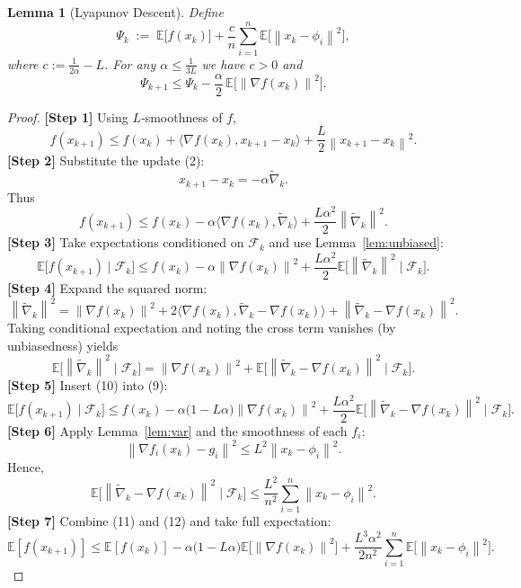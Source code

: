 \documentclass{article}
\newtheorem{lemma}{Lemma}
\newcommand{\E}{\mathbb{E}}
\newcommand{\grad}{\nabla}
\newcommand{\norm}[1]{\left\|#1\right\|}
\newcommand{\inner}[2]{\langle #1,#2\rangle}
\begin{document}
\begin{lemma}[Lyapunov Descent]\label{lem:lyapunov}
Define
\[
\Psi_k\;:=\; \E\!\bigl[f(x_k)\bigr]
+\frac{c}{n}\sum_{i=1}^{n}\E\!\bigl[\norm{x_k-\phi_i}^{2}\bigr],
\]
where $c:=\frac{1}{2\alpha}-L$. For any $\alpha\le\frac{1}{3L}$ we have $c>0$ and
\[
\Psi_{k+1}\le \Psi_k-\frac{\alpha}{2}\,\E\!\bigl[\norm{\grad f(x_k)}^{2}\bigr].
\tag{6}
\]
\end{lemma}
\begin{proof}
\textbf{[Step 1]} Using $L$‑smoothness of $f$,
\[
f(x_{k+1})\le f(x_k)+\inner{\grad f(x_k)}{x_{k+1}-x_k}
+\frac{L}{2}\norm{x_{k+1}-x_k}^{2}.
\tag{7}
\]
\textbf{[Step 2]} Substitute the update (2):
\[
x_{k+1}-x_k=-\alpha\widetilde{\nabla}_k .
\]
Thus
\[
f(x_{k+1})\le f(x_k)-\alpha\inner{\grad f(x_k)}{\widetilde{\nabla}_k}
+\frac{L\alpha^{2}}{2}\norm{\widetilde{\nabla}_k}^{2}.
\tag{8}
\]
\textbf{[Step 3]} Take expectations conditioned on $\mathcal{F}_k$ and use Lemma~\ref{lem:unbiased}:
\[
\E\!\bigl[f(x_{k+1})\mid\mathcal{F}_k\bigr]
\le f(x_k)-\alpha\norm{\grad f(x_k)}^{2}
+\frac{L\alpha^{2}}{2}\E\!\bigl[\norm{\widetilde{\nabla}_k}^{2}\mid\mathcal{F}_k\bigr].
\tag{9}
\]
\textbf{[Step 4]} Expand the squared norm:
\[
\norm{\widetilde{\nabla}_k}^{2}
=\norm{\grad f(x_k)}^{2}
+2\inner{\grad f(x_k)}{\widetilde{\nabla}_k-\grad f(x_k)}
+\norm{\widetilde{\nabla}_k-\grad f(x_k)}^{2}.
\]
Taking conditional expectation and noting the cross term vanishes (by unbiasedness) yields
\[
\E\!\bigl[\norm{\widetilde{\nabla}_k}^{2}\mid\mathcal{F}_k\bigr]
=\norm{\grad f(x_k)}^{2}
+\E\!\bigl[\norm{\widetilde{\nabla}_k-\grad f(x_k)}^{2}\mid\mathcal{F}_k\bigr].
\tag{10}
\]
\textbf{[Step 5]} Insert (10) into (9):
\[
\E\!\bigl[f(x_{k+1})\mid\mathcal{F}_k\bigr]
\le f(x_k)-\alpha\bigl(1-L\alpha\bigr)\norm{\grad f(x_k)}^{2}
+\frac{L\alpha^{2}}{2}\E\!\bigl[\norm{\widetilde{\nabla}_k-\grad f(x_k)}^{2}\mid\mathcal{F}_k\bigr].
\tag{11}
\]
\textbf{[Step 6]} Apply Lemma~\ref{lem:var} and the smoothness of each $f_i$:
\[
\norm{\grad f_i(x_k)-g_i}^{2}
\le L^{2}\norm{x_k-\phi_i}^{2}.
\]
Hence,
\[
\E\!\bigl[\norm{\widetilde{\nabla}_k-\grad f(x_k)}^{2}\mid\mathcal{F}_k\bigr]
\le \frac{L^{2}}{n^{2}}\sum_{i=1}^{n}\norm{x_k-\phi_i}^{2}.
\tag{12}
\]
\textbf{[Step 7]} Combine (11) and (12) and take full expectation:
\[
\E[f(x_{k+1})]\le \E[f(x_k)]-\alpha\bigl(1-L\alpha\bigr)\E\!\bigl[\norm{\grad f(x_k)}^{2}\bigr]
+\frac{L^{3}\alpha^{2}}{2n^{2}}\sum_{i=1}^{n}\E\!\bigl[\norm{x_k-\phi_i}^{2}\bigr].
\tag{13}
\]


\end{proof}
\end{document}
